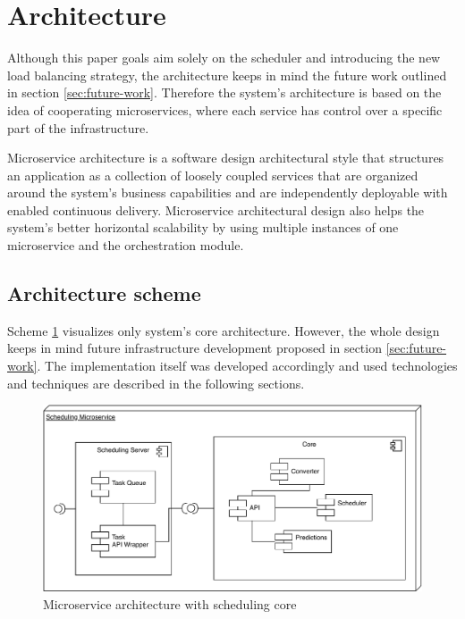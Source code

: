 \section{Architecture}\label{sec:architecture}
Although this paper goals aim solely on the scheduler and introducing the new load balancing strategy,
the architecture keeps in mind the future work outlined in section \ref{sec:future-work}.
Therefore the system's architecture is based on the idea of cooperating microservices,
where each service has control over a specific part of the infrastructure. 

Microservice architecture is a software design architectural style 
that structures an application as a collection of loosely coupled services that are organized around the system's business capabilities\cite{namiot2014micro} 
and are independently deployable with enabled continuous delivery\cite{balalaie2016microservices}.
Microservice architectural design also helps the system's better horizontal scalability
by using multiple instances of one microservice 
and the orchestration module.

\subsection{Architecture scheme}\label{subsec:architecture-scheme}
Scheme \ref{fig:scheduling-core-arch} visualizes only system's core architecture. 
However,
the whole design keeps in mind future infrastructure development proposed in section \ref{sec:future-work}.
The implementation itself was developed accordingly 
and used technologies and techniques are described in the following sections.

\begin{figure}[ht]
    \includegraphics[width=\textwidth]{i_scheduler.pdf} 
    \centering
    \caption{Microservice architecture with scheduling core}
    \label{fig:scheduling-core-arch}
\end{figure}

